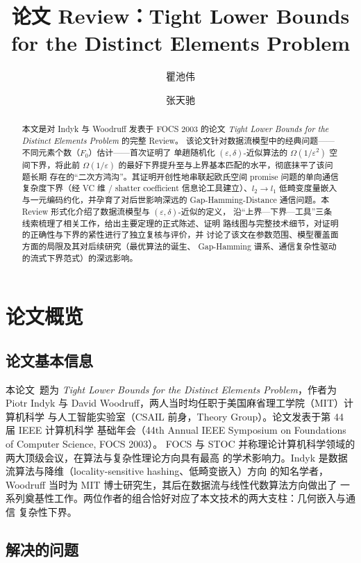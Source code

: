 \documentclass[UTF8, 11pt, a4paper, linestretch=1.15]{ctexart}
\title{论文 Review：Tight Lower Bounds for the Distinct Elements Problem}
\author{瞿池伟 \and 张天驰}
\theoremstyle{zhstyle}
\newcommand{\eps}{\varepsilon}
\newcommand{\Fzero}{F_0}
\begin{document}
	\maketitle
	
	\begin{abstract}
		\noindent
		本文是对 Indyk 与 Woodruff 发表于 FOCS 2003 的论文
		\emph{Tight Lower Bounds for the Distinct Elements Problem} 的完整 Review。
		该论文针对数据流模型中的经典问题——不同元素个数（$\Fzero$）估计——首次证明了
		单趟随机化 $(\eps, \delta)$-近似算法的 $\Omega(1/\eps^2)$ 空间下界，将此前
		$\Omega(1/\eps)$ 的最好下界提升至与上界基本匹配的水平，彻底抹平了该问题长期
		存在的“二次方鸿沟”。其证明开创性地串联起欧氏空间 promise 问题的单向通信
		复杂度下界（经 VC 维 / shatter coefficient 信息论工具建立）、$l_2 \to l_1$
		低畸变度量嵌入与一元编码约化，并孕育了对后世影响深远的 Gap-Hamming-Distance
		通信问题。本 Review 形式化介绍了数据流模型与 $(\eps, \delta)$-近似的定义，
		沿“上界—下界—工具”三条线索梳理了相关工作，给出主要定理的正式陈述、证明
		路线图与完整技术细节，对证明的正确性与下界的紧性进行了独立复核与评价，并
		讨论了该文在参数范围、模型覆盖面方面的局限及其对后续研究（最优算法的诞生、
		Gap-Hamming 谱系、通信复杂性驱动的流式下界范式）的深远影响。
	\end{abstract}
	
	\tableofcontents
	\newpage
	
	\section{论文概览}
	
	\subsection{论文基本信息}
	
	本论文~\cite{IW03}题为 \emph{Tight Lower Bounds for the Distinct Elements Problem}，作者为
	Piotr Indyk 与 David Woodruff，两人当时均任职于美国麻省理工学院（MIT）计算机科学
	与人工智能实验室（CSAIL 前身，Theory Group）。论文发表于第 44 届 IEEE 计算机科学
	基础年会（44th Annual IEEE Symposium on Foundations of Computer Science, FOCS 2003）。
	FOCS 与 STOC 并称理论计算机科学领域的两大顶级会议，在算法与复杂性理论方向具有最高
	的学术影响力。Indyk 是数据流算法与降维（locality-sensitive hashing、低畸变嵌入）方向
	的知名学者，Woodruff 当时为 MIT 博士研究生，其后在数据流与线性代数算法方向做出了
	一系列奠基性工作。两位作者的组合恰好对应了本文技术的两大支柱：几何嵌入与通信
	复杂性下界。
	
	\subsection{解决的问题}
	
\end{document}
